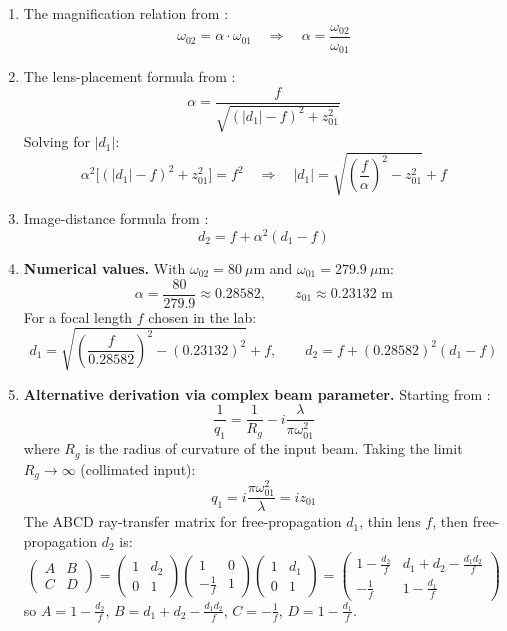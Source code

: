 \documentclass[11pt, letterpaper]{article}
\begin{document}
\begin{enumerate}
    \item The magnification relation from \cite{edmund}:
\begin{equation}\label{M}
    \omega_{02}=\alpha\cdot\omega_{01}
    \quad\Rightarrow\quad
    \alpha=\frac{\omega_{02}}{\omega_{01}}
\end{equation}

    \item The lens-placement formula from \cite{edmund}:
\begin{equation}\label{18}
    \alpha = \frac{f}{\sqrt{(|d_1| - f)^2 + z_{01}^2}}
\end{equation}
Solving for $|d_1|$:
$$\alpha^2\bigl[(|d_1|-f)^2+z_{01}^2\bigr]=f^2
\quad\Rightarrow\quad
|d_1|=\sqrt{\left(\frac{f}{\alpha}\right)^2-z_{01}^2}+f$$

    \item Image-distance formula from \cite{edmund}:
\begin{equation}\label{22}
    d_2 = f + \alpha^2(d_1 - f)
\end{equation}

    \item \textbf{Numerical values.} With $\omega_{02}=80~\mu$m and $\omega_{01}=279.9~\mu$m:
$$\alpha=\frac{80}{279.9}\approx 0.28582,\qquad z_{01}\approx 0.23132\text{ m}$$
For a focal length $f$ chosen in the lab:
$$d_1 = \sqrt{\left(\frac{f}{0.28582}\right)^2-(0.23132)^2}+f,
\qquad
d_2 = f + (0.28582)^2(d_1-f)$$

    \item \textbf{Alternative derivation via complex beam parameter.} Starting from \cite{Osche}:
\begin{equation}\label{complex}
    \frac{1}{q_1} = \frac{1}{R_{g}} - i\frac{\lambda}{\pi \omega_{01}^2}
\end{equation}
where $R_g$ is the radius of curvature of the input beam. Taking the limit $R_g\to\infty$ (collimated input):
$$q_1 = i\frac{\pi \omega_{01}^2}{\lambda}=iz_{01}$$
The ABCD ray-transfer matrix for free-propagation $d_1$, thin lens $f$, then free-propagation $d_2$ is:
$$\begin{pmatrix} A & B \\ C & D \end{pmatrix}
= \begin{pmatrix} 1 & d_2 \\ 0 & 1 \end{pmatrix}
  \begin{pmatrix} 1 & 0 \\ -\frac{1}{f} & 1 \end{pmatrix}
  \begin{pmatrix} 1 & d_1 \\ 0 & 1 \end{pmatrix}
=\begin{pmatrix} 1 - \frac{d_2}{f} & d_1 + d_2 - \frac{d_1 d_2}{f} \\ -\frac{1}{f} & 1 - \frac{d_1}{f} \end{pmatrix}$$
so $A=1 - \frac{d_2}{f}$, $B=d_1 + d_2 - \frac{d_1 d_2}{f}$, $C=-\frac{1}{f}$, $D=1 - \frac{d_1}{f}$.


\end{enumerate}
\end{document}
